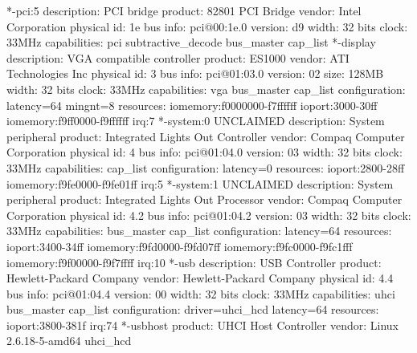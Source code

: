 \documentclass[mingoth,a4paper]{jsarticle}
\begin{document}
\begin{commandline}
        *-pci:5
             description: PCI bridge
             product: 82801 PCI Bridge
             vendor: Intel Corporation
             physical id: 1e
             bus info: pci@00:1e.0
             version: d9
             width: 32 bits
             clock: 33MHz
             capabilities: pci subtractive_decode bus_master cap_list
           *-display
                description: VGA compatible controller
                product: ES1000
                vendor: ATI Technologies Inc
                physical id: 3
                bus info: pci@01:03.0
                version: 02
                size: 128MB
                width: 32 bits
                clock: 33MHz
                capabilities: vga bus_master cap_list
                configuration: latency=64 mingnt=8
                resources: iomemory:f0000000-f7ffffff ioport:3000-30ff iomemory:f9ff0000-f9ffffff irq:7
           *-system:0 UNCLAIMED
                description: System peripheral
                product: Integrated Lights Out Controller
                vendor: Compaq Computer Corporation
                physical id: 4
                bus info: pci@01:04.0
                version: 03
                width: 32 bits
                clock: 33MHz
                capabilities: cap_list
                configuration: latency=0
                resources: ioport:2800-28ff iomemory:f9fe0000-f9fe01ff irq:5
           *-system:1 UNCLAIMED
                description: System peripheral
                product: Integrated Lights Out  Processor
                vendor: Compaq Computer Corporation
                physical id: 4.2
                bus info: pci@01:04.2
                version: 03
                width: 32 bits
                clock: 33MHz
                capabilities: bus_master cap_list
                configuration: latency=64
                resources: ioport:3400-34ff iomemory:f9fd0000-f9fd07ff iomemory:f9fc0000-f9fc1fff iomemory:f9f00000-f9f7ffff irq:10
           *-usb
                description: USB Controller
                product: Hewlett-Packard Company
                vendor: Hewlett-Packard Company
                physical id: 4.4
                bus info: pci@01:04.4
                version: 00
                width: 32 bits
                clock: 33MHz
                capabilities: uhci bus_master cap_list
                configuration: driver=uhci_hcd latency=64
                resources: ioport:3800-381f irq:74
              *-usbhost
                   product: UHCI Host Controller
                   vendor: Linux 2.6.18-5-amd64 uhci_hcd

\end{commandline}
\end{document}

